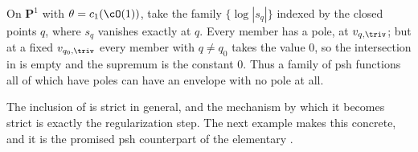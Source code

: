 \begin{remark}
\label{rem:ch45-pole-strict}
On $\mathbf P^1$ with $\theta=c_1(\cO(1))$, take the family
$\{\log|s_q|\}$ indexed by the closed points $q$, where $s_q$ vanishes
exactly at $q$.  Every member has a pole, at $v_{q,\triv}$; but at a
fixed $v_{q_0,\triv}$ every member with $q\ne q_0$ takes the value
$0$, so the intersection in  is empty and the
supremum is the constant $0$.  Thus a family of psh functions all of which
have poles can have an envelope with no pole at all.
\end{remark}

The inclusion of  is strict in general, and the
mechanism by which it becomes strict is exactly the regularization step.
The next example makes this concrete, and it is the promised
psh counterpart of the elementary .

